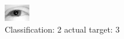 \begin{figure}[h!]
\begin{center}
\includegraphics[width=0.60\columnwidth]{figures/ID2382_class_2_target_3.png}
\end{center}
\caption{ Classification: 2 actual target: 3}
\label{fig:ID2382_class_2_target_3}
\end{figure}
